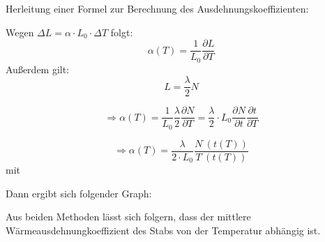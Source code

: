Herleitung einer Formel zur Berechnung des Ausdehnungskoeffizienten:

Wegen $ \Delta L = \alpha \cdot L_{0} \cdot \Delta T $ folgt: 
\\
\begin{equation}
\alpha (T) = \frac{1}{L_{0}} \frac{\partial L}{\partial T}
\end{equation}
Außerdem gilt: 
\begin{equation}
L = \frac{\lambda}{2} N
\end{equation}

\begin{equation}
\Rightarrow \alpha(T) = \frac{1}{L_{0}} \frac{\lambda}{2} \frac{\partial N}{\partial T} = \frac{\lambda}{2} \cdot L_{0} \frac{\partial N}{\partial t} \frac{\partial t}{\partial T}
\end{equation}

\begin{equation}
\Rightarrow \alpha (T) = \frac{\lambda}{2 \cdot L_{0}} \frac{N^{\cdot}(t(T))}{T^{\cdot}(t(T))}
\end{equation} 
mit 

Dann ergibt sich folgender Graph:

Aus beiden Methoden lässt sich folgern, dass der mittlere Wärmeausdehnungkoeffizient des Stabs von der Temperatur abhängig ist.

